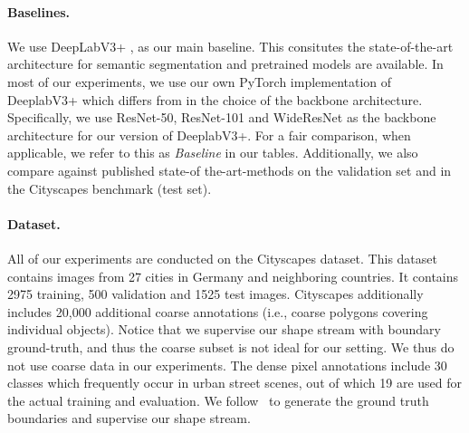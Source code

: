 \documentclass[10pt,twocolumn,letterpaper]{article}
\begin{document}
\paragraph{Baselines.}
We use DeepLabV3+ \cite{deeplabv3plus2018}, as our main baseline. This 
consitutes the state-of-the-art architecture for semantic segmentation
and
pretrained models are available.
In most of our experiments, we use our own PyTorch implementation of DeeplabV3+ which differs from \cite{deeplabv3plus2018} in the choice of the backbone architecture. 
Specifically, we use ResNet-50, ResNet-101 and WideResNet as the backbone architecture for our version of DeeplabV3+.
For a fair comparison, when applicable, we refer to this as \emph{Baseline} in our tables.
Additionally,  we also compare against 
published state-of the-art-methods on the validation set and in the Cityscapes benchmark (test set). 
\vspace{-3mm}
\paragraph{Dataset.} 
All of our experiments are conducted on the Cityscapes dataset.
This dataset contains images 
from 27 cities in Germany and neighboring countries. It
contains 2975 training, 500 validation and 1525 test images. 
Cityscapes additionally includes 20,000 additional coarse annotations
(i.e., coarse polygons covering individual objects).
Notice that we supervise our shape stream with boundary ground-truth, and thus the coarse subset is not ideal for our setting. We thus do not use coarse data in our experiments. 
The dense pixel annotations include 30 classes which frequently occur in urban street scenes, out of which 19 are used for the actual training and evaluation. 
We follow~\cite{yu2017casenet,yu2018seal,david19edges} to generate the ground truth
boundaries and supervise our shape stream. 



\vspace{-4mm}
\end{document}
